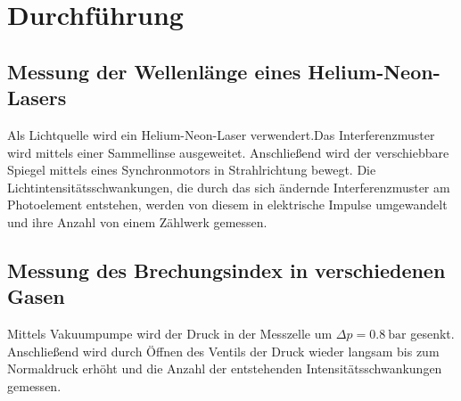 \section{Durchführung}
\label{sec:Durchführung}

\subsection{Messung der Wellenlänge eines Helium-Neon-Lasers}
\label{sec:WL}
Als Lichtquelle wird ein Helium-Neon-Laser verwendert.Das Interferenzmuster wird mittels einer Sammellinse ausgeweitet. Anschließend wird der verschiebbare Spiegel mittels eines Synchronmotors in Strahlrichtung bewegt. Die Lichtintensitätsschwankungen, die durch das sich ändernde Interferenzmuster am Photoelement entstehen, werden von diesem in elektrische Impulse umgewandelt und ihre Anzahl von einem Zählwerk gemessen.
\subsection{Messung des Brechungsindex in verschiedenen Gasen}
Mittels Vakuumpumpe wird der Druck in der Messzelle um $\Delta p = \SI{0,8}{\bar}$ gesenkt. Anschließend wird durch Öffnen des Ventils der Druck wieder langsam bis zum Normaldruck erhöht und die Anzahl der entstehenden Intensitätsschwankungen gemessen.
